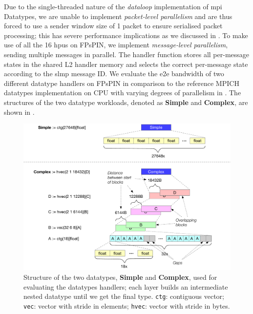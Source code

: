 Due to the single-threaded nature of the \emph{dataloop} implementation of \ac{mpi} Datatypes, we are unable to implement \emph{packet-level parallelism} and are thus forced to use a sender window size of 1 packet to ensure serialised packet processing; this has severe performance implications as we discussed in .  To make use of all the 16 \ac{hpu}s on FPsPIN, we implement \emph{message-level parallelism}, sending multiple messages in parallel.  The handler function stores all per-message states in the shared L2 handler memory and selects the correct per-message state according to the \ac{slmp} message ID.  We evaluate the \ac{e2e} bandwidth of two different datatype handlers on FPsPIN in comparison to the reference MPICH datatypes implementation on CPU with varying degrees of parallelism in .  The structures of the two datatype workloads, denoted as \textbf{Simple} and \textbf{Complex}, are shown in .

\begin{figure}[tp]
    \centering
    \includegraphics[width=\textwidth]{figures/datatypes-structure.pdf}
    \caption{Structure of the two datatypes, \textbf{Simple} and \textbf{Complex}, used for evaluating the datatypes handlers; each layer builds an intermediate nested datatype until we get the final type.  \texttt{ctg}: contiguous vector; \texttt{vec}: vector with stride in elements; \texttt{hvec}: vector with stride in bytes.} \label{fig:datatypes-structure}
\end{figure}


